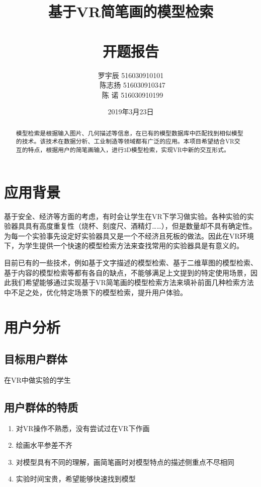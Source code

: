 \documentclass{article}
\title{基于VR简笔画的模型检索\\\ \\ 开题报告}
\author{
罗宇辰 516030910101  \\\
陈志扬 516030910347  \\\
陈  诺 516030910199 
}
\date{2019年3月23日}
\begin{document}
\maketitle
\tableofcontents

\clearpage

\begin{abstract}
模型检索是根据输入图片、几何描述等信息，在已有的模型数据库中匹配找到相似模型的技术。该技术在数据分析、工业制造等领域都有广泛的应用。本项目希望结合VR交互的特点，根据用户的简笔画输入，进行3D模型检索，实现VR中新的交互形式。
\end{abstract}

\section{应用背景}

基于安全、经济等方面的考虑，有时会让学生在VR下学习做实验。各种实验的实验器具具有高度重复性（烧杯、刻度尺、酒精灯……），但是数量却不具有确定性。为每一个实验事先设定好实验器具又是一个不经济且死板的做法。因此在VR环境下，为学生提供一个快速的模型检索方法来查找常用的实验器具是有意义的。

目前已有的一些技术，例如基于文字描述的模型检索、基于二维草图的模型检索、基于内容的模型检索等都有各自的缺点，不能够满足上文提到的特定使用场景，因此我们希望能够通过实现基于VR简笔画的模型检索方法来填补前面几种检索方法中不足之处，优化特定场景下的模型检索，提升用户体验。  


\section{用户分析}

\subsection{目标用户群体}
    在VR中做实验的学生
\subsection{用户群体的特质}
\begin{enumerate}
    \item 对VR操作不熟悉，没有尝试过在VR下作画
    \item 绘画水平参差不齐
    \item 对模型具有不同的理解，画简笔画时对模型特点的描述侧重点不尽相同
    \item 实验时间宝贵，希望能够快速找到模型
\end{enumerate}
\end{document}
